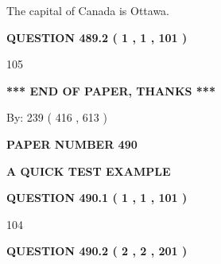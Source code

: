 \documentclass[12pt]{article}
\begin{document}
 
The capital of Canada is Ottawa.
 
 
 
 
  
\vspace{0.2in}
  
{\textbf{\Large{QUESTION
489.2 
 ( 1 , 1 , 101 )
}}}
  
  
 
 
\noindent{}

105
 
 
   
   
 \vspace{0.2in}
 
   
   
   
   
\vspace{1.0in} 
{\textbf{\large{ *** END OF PAPER, THANKS *** }}} 
   
   
\hspace{1.0in} By: 
 239 ( 416 ,  613 )
   
   
   
   
\newpage 
\setcounter{page}{ 
   490001 } 
   
   
   
   
 {\textbf{ \Large{ PAPER NUMBER  490  }}}
   
   
\vspace{0.2in}
   
   
   
   
   
   
 \vspace{0.2in}
{\LARGE {\textbf{ A QUICK TEST EXAMPLE}}}
   
   
  
\vspace{0.2in}
  
{\textbf{\Large{QUESTION
490.1 
 ( 1 , 1 , 101 )
}}}
  
  
 
 
\noindent{}

104
 
 
  
\vspace{0.2in}
  
{\textbf{\Large{QUESTION
490.2 
 ( 2 , 2 , 201 )
}}}
  
\end{document}
